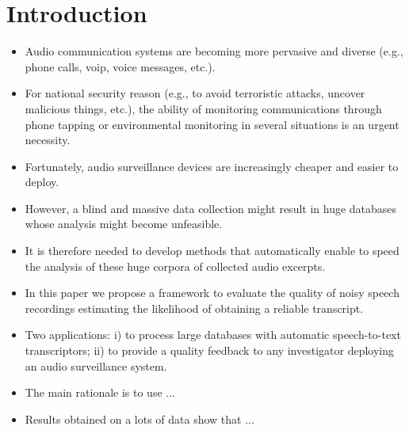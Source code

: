 \section{Introduction}\label{sec:intro}
\begin{itemize}
	\item Audio communication systems are becoming more pervasive and diverse (e.g., phone calls, voip, voice messages, etc.).
	\item For national security reason (e.g., to avoid terroristic attacks, uncover malicious things, etc.), the ability of monitoring communications through phone tapping or environmental monitoring in several situations is an urgent necessity.
	\item Fortunately, audio surveillance devices are increasingly cheaper and easier to deploy.
	\item However, a blind and massive data collection might result in huge databases whose analysis might become unfeasible.
	\item It is therefore needed to develop methods that automatically enable to speed the analysis of these huge corpora of collected audio excerpts.
	\item In this paper we propose a framework to evaluate the quality of noisy speech recordings estimating the likelihood of obtaining a reliable transcript.
	\item Two applications: i) to process large databases with automatic speech-to-text transcriptors; ii) to provide a quality feedback to any investigator deploying an audio surveillance system.
	\item The main rationale is to use ...
	\item Results obtained on a lots of data show that ...
\end{itemize}


\cite{Piva2013}
